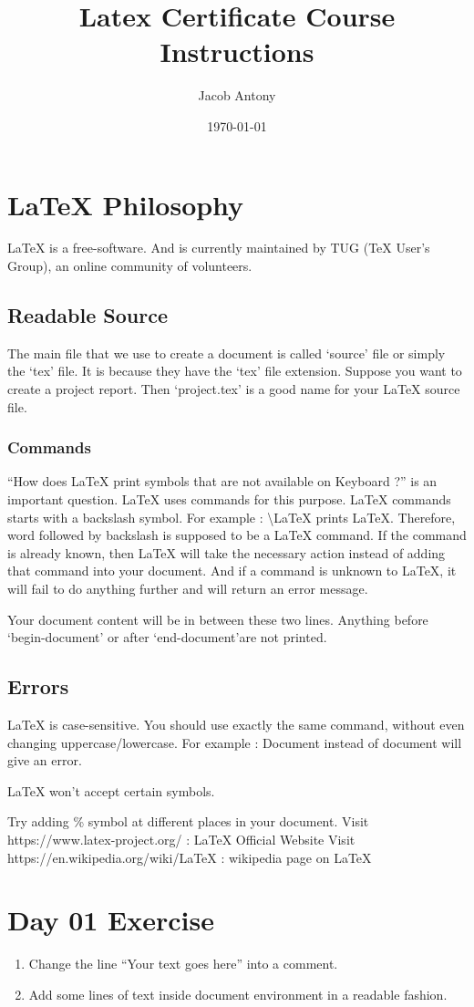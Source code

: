 \documentclass{article}
\title{Latex Certificate Course Instructions}
\author{Jacob Antony}
\date{\today}
\begin{document}
\maketitle
\section{LaTeX Philosophy}
	LaTeX is a free-software.
	And is currently maintained by TUG (TeX User's Group), an online community of volunteers.
\subsection{Readable Source}
	The main file that we use to create a document is called `source' file or simply the `tex' file.
	It is because they have the `tex' file extension.
	Suppose you want to create a project report.
	Then `project.tex' is a good name for your LaTeX source file.
\subsubsection{Commands}
	``How does LaTeX print symbols that are not available on Keyboard ?''
	is an important question.
	LaTeX uses commands for this purpose.
	LaTeX commands starts with a backslash symbol.
	For example : \textbackslash LaTeX prints \LaTeX.
	Therefore, word followed by backslash is supposed to be a LaTeX command.
	If the command is already known, then LaTeX will take the necessary action instead of adding that command into your document.
	And if a command is unknown to LaTeX, it will fail to do anything further and will return an error message.


	Your document content will be in between these two lines.
	Anything before `begin-document' or after `end-document'are not printed.

\subsection{Errors}
 	LaTeX is case-sensitive.
	You should use exactly the same command, without even changing uppercase/lowercase.
	For example : Document instead of document will give an error.

	LaTeX won't accept certain symbols.


	Try adding \% symbol at different places in your document.
	Visit https://www.latex-project.org/ : LaTeX Official Website
	Visit https://en.wikipedia.org/wiki/LaTeX : wikipedia page on LaTeX

\section{Day 01 Exercise}
\begin{enumerate}
	\item Change the line ``Your text goes here'' into a comment.
	\item Add some lines of text inside document environment in a readable fashion.
\end{enumerate}
\end{document}

